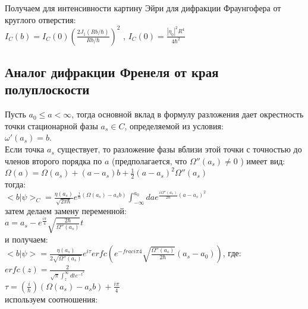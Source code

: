 \documentclass[11pt]{report}
\begin{document}
Получаем для интенсивности картину Эйри для дифракции Фраунгофера от круглого отверстия:\\

$I_C(b) = I_C(0)(\frac{2J_1(Rb/\hbar)}{Rb/\hbar})^2$ , $I_C(0) = \frac{|\eta_0|^2R^4}{4\hbar^2 }$ \\



\subsection{Аналог дифракции Френеля от края полуплоскости}
Пусть $a_0 \leq a < ∞$, тогда основной вклад в формулу разложения дает окрестность точки стационарной фазы $a_s \in C$, определяемой из условия: \\

$\omega'(a_s)=b $. \\

Если точка $a_s$ существует, то разложение фазы вблизи этой точки с точностью до членов второго порядка по $a$ (предполагается, что $\Omega''(a_s)\neq0 $ ) имеет вид: \\

$\Omega(a) = \Omega(a_s) + (a-a_s)b + \frac{1}{2}(a-a_s)^2\Omega''(a_s)$ \\

тогда: \\

$<b|\psi>_C = \frac{\eta(a_s)}{\sqrt{2\pi \hbar}}e^{\frac{i}{\hbar}(\Omega(a_s)-a_sb)}\int_{-∞}^{a_0}dae^{\frac{i\Omega''(a_s)}{2\hbar}(a-a_s)^2} $ \\

затем делаем замену переменной: \\

 $a=a_s-e^{\frac{i\pi}{4}}\sqrt{\frac{2\hbar}{\Omega''(a_s)}}t$ \\
 
 и получаем: \\

$<b|\psi>=\frac{\eta(a_s)}{2\sqrt{\Omega''(a_s)}}e^{i\tau}erfc(e^{-frac{i\pi}{4}}\sqrt{\frac{\Omega''(a_s)}{2\hbar}}(a_s-a_0)) $, где: \\

$ erfc(z)= \frac{2}{\sqrt\pi\int_z^∞dte^{-t^2}}$ \\

$\tau = (\frac{i}{\hbar})(\Omega(a_s) -a_sb) + \frac{i\pi }{4} $ \\

используем соотношения:\\
\end{document}
